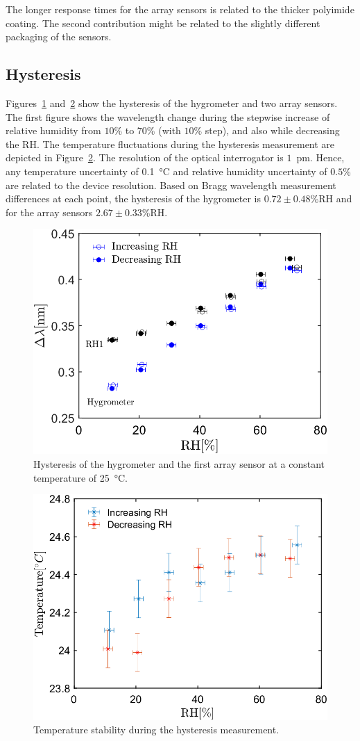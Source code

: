 The longer response times for the array sensors is related to the thicker polyimide coating. The second contribution might be related to the slightly different packaging of the sensors. 

\subsection{Hysteresis}
Figures~\ref{fig_hysteresis} and~\ref{fig_hysteresis2} show the hysteresis of the hygrometer and two array sensors. The first figure shows the wavelength change during the stepwise increase of relative humidity from $10$\% to $70$\% (with $10$\% step), and also while decreasing the \gls{RH}. The temperature fluctuations during the hysteresis measurement are depicted in Figure~\ref{fig_hysteresis2}. The resolution of the optical interrogator is $1$~pm. Hence, any temperature uncertainty of \SI{0.1}{\celsius} and relative humidity uncertainty of $0.5$\% are related to the device resolution. Based on Bragg wavelength measurement differences at each point, the hysteresis of the hygrometer is $0.72\pm0.48$\%RH and for the array sensors $2.67\pm0.33$\%RH. 

\begin{figure}[!h]
\centering
\includegraphics[width=0.6\columnwidth]{Chapter5/images/25_RHS.png}
\caption{Hysteresis of the hygrometer and the first array sensor at a constant temperature of \SI{25}{\celsius}.}
\label{fig_hysteresis}
\end{figure}

\begin{figure}[!h]
\centering
\includegraphics[width=0.6\columnwidth]{Chapter5/images/25_RHST.png}
\caption{Temperature stability during the hysteresis measurement.}
\label{fig_hysteresis2}
\end{figure}
\newpage
